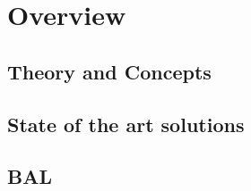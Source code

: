 



\section{Overview}

\subsection{Theory and Concepts}
 

\subsection{State of the art solutions} 















\subsection{BAL} 

 
